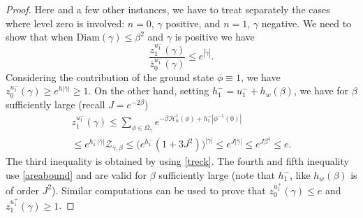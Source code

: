 \documentclass[10pt]{amsart}
\let\mathcal\mathscr
\numberwithin{equation}{section}
\theoremstyle{plain}
\theoremstyle{definition}
\newcommand{\Diam}{\mathrm{Diam}}
\newcommand{\cH}{{\ensuremath{\mathcal H}} }
\newcommand{\cZ}{{\ensuremath{\mathcal Z}} }
\newcommand{\gb}{\beta}
\newcommand{\gO}{\Omega}
\begin{document}
\begin{proof}
Here and a few other instances,
we have to treat separately the cases where level zero is involved: $n=0$, $\gamma$ positive, and $n=1$, $\gamma$ negative.
We need to show that when $\Diam(\gamma)\le \gb^2$ and $\gamma$ is positive we have
\begin{equation*}
\frac{z^{u^-_1}_{1}(\gamma)}{\bar z^{u^-_1}_0(\gamma)}\le e^{|\tilde \gamma|}.
\end{equation*}
Considering the contribution of the ground state $\phi\equiv 1$, we have $z^{u^-_1}_{0}(\gamma)\ge e^{h|\bar \gamma|}\ge 1$.
On the other hand, setting $h^-_1=u^-_1+h_w(\gb)$,
we have for $\gb$ sufficiently large (recall $J=e^{-2\gb}$)
\begin{multline}\label{truxc}
z^{u^-_1}_{1}(\gamma)\le \sum_{\phi\in \gO_{\bar \gamma}} e^{-\gb\cH^1_n(\phi)+h^-_1|\phi^{-1}(0)|}\\[-10pt]
\le
e^{h^-_1|\bar \gamma|} \cZ_{\bar \gamma,\gb}\le \bigl(e^{h^-_1}(1+3J^2) \bigr)^{|\bar \gamma|}\le
e^{J |\bar \gamma|}\le e^{J\gb^4}\le e.
\end{multline}
The third inequality is obtained by using \eqref{treck}.
The fourth and fifth inequality use \eqref{areabound} and are valid for $\gb$ sufficiently large (note that $h^-_1$, like $h_w(\gb)$ is of order $J^2$).
Similar computations can be used to prove that $z^{u^+_1}_{0}(\gamma)\le e $ and $z^{u^+_1}_{1}(\gamma)\ge 1$.


\end{proof}
\end{document}
